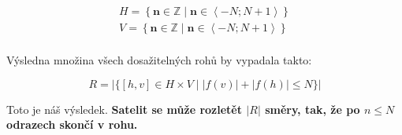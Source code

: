 \documentclass[11pt, a4paper]{article}
\begin{document}
    \begin{gather*}
        H = \left\{ \mathbf{n} \in \mathbb{Z} \mid \mathbf{n} \in \left\langle -N; N+1 \right\rangle \right\}\\
        V = \left\{ \mathbf{n} \in \mathbb{Z} \mid \mathbf{n} \in \left\langle -N; N+1 \right\rangle \right\}\\
    \end{gather*}

    Výsledna množina všech dosažitelných rohů by vypadala takto:

    \[
        R = \left| \{ [h, v] \in H \times V \mid |f(v)| + |f(h)| \leq N \} \right|
    \]

    Toto je náš výsledek.
    \textbf{Satelit se může rozletět $|R|$ směry, tak, že po $n \leq N$ odrazech skončí v rohu.}
\end{document}

